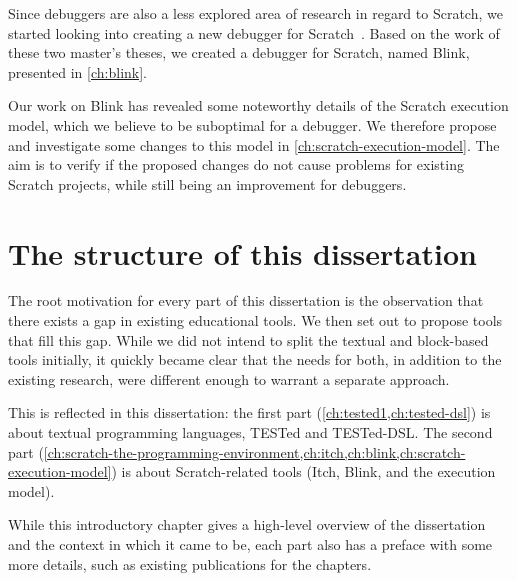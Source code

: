 \documentclass[./main]{subfiles}
\begin{document}
Since debuggers are also a less explored area of research in regard to Scratch, we started looking into creating a new debugger for Scratch~\autocite{deproftBlinkEenEducatieve2022,goethalsEenTimeTravelling2023}.
Based on the work of these two master's theses, we created a debugger for Scratch, named Blink, presented in \cref{ch:blink}.

Our work on Blink has revealed some noteworthy details of the Scratch execution model, which we believe to be suboptimal for a debugger.
We therefore propose and investigate some changes to this model in \cref{ch:scratch-execution-model}.
The aim is to verify if the proposed changes do not cause problems for existing Scratch projects, while still being an improvement for debuggers.

\section{The structure of this dissertation}\label{sec:a-note-on-the-structure-of-this-thesis}

The root motivation for every part of this dissertation is the observation that there exists a gap in existing educational tools.
We then set out to propose tools that fill this gap.
While we did not intend to split the textual and block-based tools initially, it quickly became clear that the needs for both, in addition to the existing research, were different enough to warrant a separate approach.

This is reflected in this dissertation: the first part (\cref{ch:tested1,ch:tested-dsl}) is about textual programming languages, TESTed and TESTed-DSL\@.
The second part (\cref{ch:scratch-the-programming-environment,ch:itch,ch:blink,ch:scratch-execution-model}) is about Scratch-related tools (Itch, Blink, and the execution model).

While this introductory chapter gives a high-level overview of the dissertation and the context in which it came to be, each part also has a preface with some more details, such as existing publications for the chapters.
\end{document}

